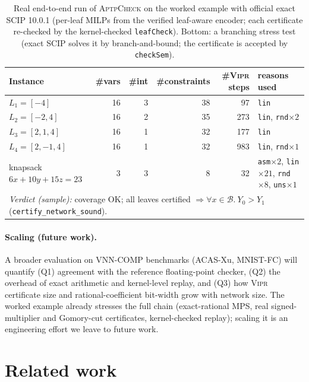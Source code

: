 \documentclass[runningheads]{llncs}
\newcommand{\dom}{\mathcal{B}}          %
\newcommand{\leaf}{L}
\newcommand{\vipr}{\textsc{Vipr}}
\newcommand{\scip}{\textsc{SCIP}}
\newcommand{\tool}{\textsc{AptpCheck}}
\newcommand{\sound}{\textsf{certified}}
\newcommand{\code}[1]{\texttt{#1}}
\begin{document}
\begin{table}[t]
\centering
\caption{Real end-to-end run of \tool{} on the worked example with official exact
\scip{} 10.0.1 (per-leaf MILPs from the verified leaf-aware encoder; each certificate
re-checked by the kernel-checked \code{leafCheck}). Bottom: a branching stress test
(exact \scip{} solves it by branch-and-bound; the certificate is accepted by \code{checkSem}).}
\label{tab:eval}
\begin{tabular}{lrrrrl}
\toprule
Instance & \#vars & \#int & \#constraints & \#\vipr{} steps & reasons used \\
\midrule
$\leaf_1=[-4]$      & 16 & 3 & 38 & 97  & \code{lin} \\
$\leaf_2=[-2,4]$    & 16 & 2 & 35 & 273 & \code{lin}, \code{rnd}$\times2$ \\
$\leaf_3=[2,1,4]$   & 16 & 1 & 32 & 177 & \code{lin} \\
$\leaf_4=[2,-1,4]$  & 16 & 1 & 32 & 983 & \code{lin}, \code{rnd}$\times1$ \\
\midrule
knapsack $6x{+}10y{+}15z{=}23$ & 3 & 3 & 8 & 32 &
  \code{asm}$\times2$, \code{lin}$\times21$, \code{rnd}$\times8$, \code{uns}$\times1$ \\
\midrule
\multicolumn{6}{l}{\emph{Verdict (sample):} coverage OK; all leaves \sound{}
$\Rightarrow \forall x\in\dom.\ Y_0>Y_1$ (\code{certify\_network\_sound}).} \\
\bottomrule
\end{tabular}
\end{table}

\paragraph{Scaling (future work).} A broader evaluation on VNN-COMP benchmarks
(ACAS-Xu, MNIST-FC) will quantify (Q1) agreement with the reference floating-point
checker, (Q2) the overhead of exact arithmetic and kernel-level replay, and (Q3) how
\vipr{} certificate size and rational-coefficient bit-width grow with network size. The
worked example already stresses the full chain (exact-rational MPS, real signed-multiplier
and Gomory-cut certificates, kernel-checked replay); scaling it is an engineering effort
we leave to future work.

\section{Related work}\label{sec:related}
\end{document}
